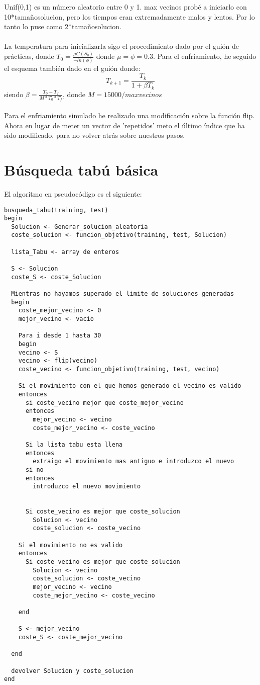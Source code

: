 Unif(0,1) es un número aleatorio entre 0 y 1. max vecinos probé a iniciarlo con 10*tamañosolucion, pero los tiempos eran extremadamente malos y lentos. Por lo tanto lo puse como 2*tamañosolucion. 
\\
\\
La temperatura para inicializarla sigo el procedimiento dado por el guión de prácticas, donde $T_{0}=\frac{\mu C(S_0)}{-ln(\phi)}$ donde $\mu = \phi = 0.3$. Para el enfriamiento, he seguido el esquema también dado en el guión donde:
$$T_{k+1} = \frac{T_k}{1+ \beta T_k}$$
siendo $\beta = \frac{T_0 - T_f}{M*T_0 * T_f}$, donde $M=15000/max vecinos$
\\
\\
Para el enfriamiento simulado he realizado una modificación sobre la función flip. Ahora en lugar de meter un vector de 'repetidos' meto el último índice que ha sido modificado, para no volver atrás sobre nuestros pasos.

\newpage

\section{Búsqueda tabú básica}
El algoritmo en pseudocódigo es el siguiente:
\begin{lstlisting}
busqueda_tabu(training, test)
begin
  Solucion <- Generar_solucion_aleatoria
  coste_solucion <- funcion_objetivo(training, test, Solucion)
  
  lista_Tabu <- array de enteros
  
  S <- Solucion
  coste_S <- coste_Solucion
  
  Mientras no hayamos superado el limite de soluciones generadas
  begin
    coste_mejor_vecino <- 0
    mejor_vecino <- vacio
    
    Para i desde 1 hasta 30
    begin
    vecino <- S
    vecino <- flip(vecino)
    coste_vecino <- funcion_objetivo(training, test, vecino)
    
    Si el movimiento con el que hemos generado el vecino es valido
    entonces
      si coste_vecino mejor que coste_mejor_vecino
      entonces
        mejor_vecino <- vecino
        coste_mejor_vecino <- coste_vecino
        
      Si la lista tabu esta llena
      entonces
        extraigo el movimiento mas antiguo e introduzco el nuevo
      si no
      entonces
        introduzco el nuevo movimiento
       
      
      Si coste_vecino es mejor que coste_solucion
        Solucion <- vecino
        coste_solucion <- coste_vecino
        
    Si el movimiento no es valido
    entonces
      Si coste_vecino es mejor que coste_solucion
        Solucion <- vecino
        coste_solucion <- coste_vecino
        mejor_vecino <- vecino
        coste_mejor_vecino <- coste_vecino
    
    end
    
    S <- mejor_vecino
    coste_S <- coste_mejor_vecino
    
  end
  
  devolver Solucion y coste_solucion
end
    
\end{lstlisting}

